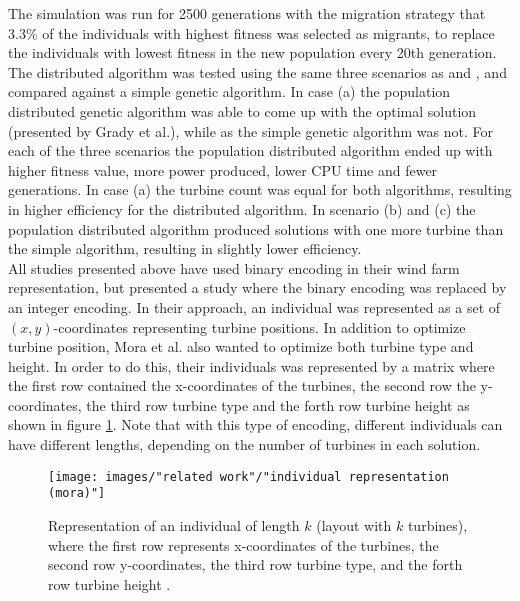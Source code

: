 \noindent The simulation was run for 2500 generations with the migration strategy that 3.3\% of the individuals with highest fitness was selected as migrants, to replace the individuals with lowest fitness in the new population every 20th generation. The distributed algorithm was tested using the same three scenarios as \cite{Mosetti} and \cite{Grady}, and compared against a simple genetic algorithm. In case (a) the population distributed genetic algorithm was able to come up with the optimal solution (presented by Grady et al.), while as the simple genetic algorithm was not. For each of the three scenarios the population distributed algorithm ended up with higher fitness value, more power produced, lower CPU time and fewer generations. In case (a) the turbine count was equal for both algorithms, resulting in higher efficiency for the distributed algorithm. In scenario (b) and (c) the population distributed algorithm produced solutions with one more turbine than the simple algorithm, resulting in slightly lower efficiency. \\


\noindent All studies presented above have used binary encoding in their wind farm representation, but \cite{Mora} presented a study where the binary encoding was replaced by an integer encoding. In their approach, an individual was represented as a set of $(x, y)$-coordinates representing turbine positions. In addition to optimize turbine position, Mora et al. also wanted to optimize both turbine type and height. In order to do this, their individuals was represented by a matrix where the first row contained the x-coordinates of the turbines, the second row the y-coordinates, the third row turbine type and the forth row turbine height as shown in figure \ref{Individual Representation (Mora)}. Note that with this type of encoding, different individuals can have different lengths, depending on the number of turbines in each solution.\\


\begin{figure}[h!]
\begin{center}
\texttt{[image: images/"related work"/"individual representation (mora)"]}
\caption{Representation of an individual of length $k$ (layout with $k$ turbines), where the first row represents x-coordinates of the turbines, the second row y-coordinates, the third row turbine type, and the forth row turbine height \citep{Mora}.}
\label{Individual Representation (Mora)}
\end{center}
\end{figure}


